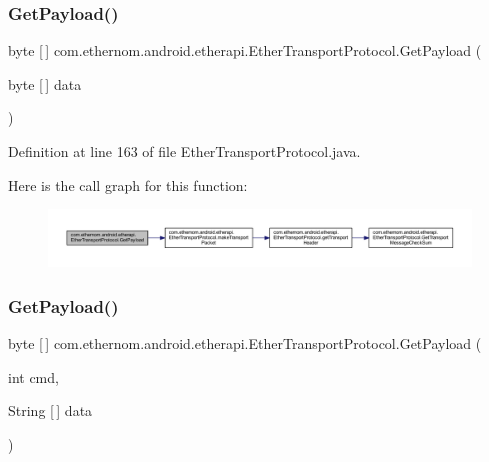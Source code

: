 \subsubsection{\texorpdfstring{Get\+Payload()}{GetPayload()}\hspace{0.1cm}{\footnotesize\ttfamily [5/6]}}
{\footnotesize\ttfamily byte \mbox{[}$\,$\mbox{]} com.\+ethernom.\+android.\+etherapi.\+Ether\+Transport\+Protocol.\+Get\+Payload (\begin{DoxyParamCaption}\item[{byte \mbox{[}$\,$\mbox{]}}]{data }\end{DoxyParamCaption})}



Definition at line 163 of file Ether\+Transport\+Protocol.\+java.

Here is the call graph for this function\+:\nopagebreak
\begin{figure}[H]
\begin{center}
\leavevmode
\includegraphics[width=350pt]{classcom_1_1ethernom_1_1android_1_1etherapi_1_1_ether_transport_protocol_a1220a8f0129eb2b2ae6bb84123dd67f9_cgraph}
\end{center}
\end{figure}
\mbox{\label{classcom_1_1ethernom_1_1android_1_1etherapi_1_1_ether_transport_protocol_ab057f7bccb0c2bef005a657cc3eef13d}} 
\subsubsection{\texorpdfstring{Get\+Payload()}{GetPayload()}\hspace{0.1cm}{\footnotesize\ttfamily [6/6]}}
{\footnotesize\ttfamily byte \mbox{[}$\,$\mbox{]} com.\+ethernom.\+android.\+etherapi.\+Ether\+Transport\+Protocol.\+Get\+Payload (\begin{DoxyParamCaption}\item[{int}]{cmd,  }\item[{String \mbox{[}$\,$\mbox{]}}]{data }\end{DoxyParamCaption})}



